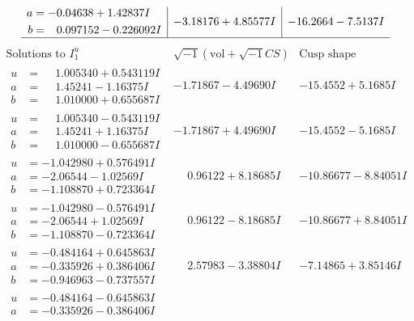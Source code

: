 \documentclass[1p]{elsarticle_modified}
\theoremstyle{definition}
\newcommand{\I}{\sqrt{-1}}
\begin{document}
$$\begin{array}{c|c|c}
\begin{aligned}
a &= -0.04638 + 1.42837 I \\
b &= \phantom{-}0.097152 - 0.226092 I\end{aligned}
 & -3.18176 + 4.85577 I & -16.2664 - 7.5137 I\\
 \hline 
 \end{array}$$\newpage$$\begin{array}{c|c|c}  
\text{Solutions to }I^u_{1}& \I (\text{vol} + \sqrt{-1}CS) & \text{Cusp shape}\\
 \hline 
\begin{aligned}
u &= \phantom{-}1.005340 + 0.543119 I \\
a &= \phantom{-}1.45241 - 1.16375 I \\
b &= \phantom{-}1.010000 + 0.655687 I\end{aligned}
 & -1.71867 - 4.49690 I & -15.4552 + 5.1685 I \\ \hline\begin{aligned}
u &= \phantom{-}1.005340 - 0.543119 I \\
a &= \phantom{-}1.45241 + 1.16375 I \\
b &= \phantom{-}1.010000 - 0.655687 I\end{aligned}
 & -1.71867 + 4.49690 I & -15.4552 - 5.1685 I \\ \hline\begin{aligned}
u &= -1.042980 + 0.576491 I \\
a &= -2.06544 - 1.02569 I \\
b &= -1.108870 + 0.723364 I\end{aligned}
 & \phantom{-}0.96122 + 8.18685 I & -10.86677 - 8.84051 I \\ \hline\begin{aligned}
u &= -1.042980 - 0.576491 I \\
a &= -2.06544 + 1.02569 I \\
b &= -1.108870 - 0.723364 I\end{aligned}
 & \phantom{-}0.96122 - 8.18685 I & -10.86677 + 8.84051 I \\ \hline\begin{aligned}
u &= -0.484164 + 0.645863 I \\
a &= -0.335926 + 0.386406 I \\
b &= -0.946963 - 0.737557 I\end{aligned}
 & \phantom{-}2.57983 - 3.38804 I & -7.14865 + 3.85146 I \\ \hline\begin{aligned}
u &= -0.484164 - 0.645863 I \\
a &= -0.335926 - 0.386406 I \\

\end{aligned}
\end{array}$$
\end{document}
